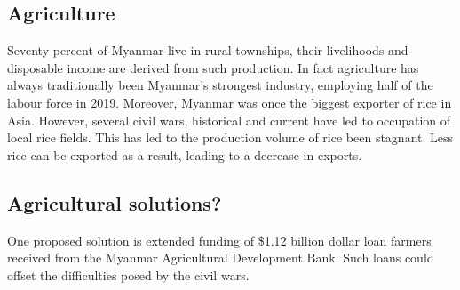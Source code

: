 \documentclass{article}
\begin{document}
\subsection*{Agriculture}
Seventy percent of Myanmar live in rural townships, their livelihoods
and disposable income are derived from such production. In fact agriculture has always
traditionally been Myanmar's strongest industry, employing half of the labour force in 2019. Moreover, Myanmar was once the biggest exporter of rice in Asia. However, several civil wars, historical and current have led to occupation of local rice fields. This has led to the production volume of rice been stagnant. Less rice can be exported as a result, leading to a decrease in exports.

\subsection*{Agricultural solutions?}
One proposed solution is extended funding of \$1.12 billion dollar loan farmers received from the Myanmar Agricultural Development Bank. Such loans could offset the difficulties posed by the civil wars.
\end{document}
